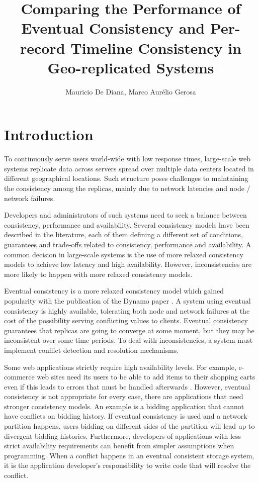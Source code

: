 \documentclass[man,floatsintext,12pt]{apa6}
\title{Comparing the Performance of Eventual Consistency and Per-record
Timeline Consistency in Geo-replicated Systems}
\author{Mauricio De Diana, Marco Aur\'{e}lio Gerosa}
\affiliation{Computer Science Department, University of S\~{a}o Paulo}
\begin{document}
\maketitle
\section{Introduction}

To continuously serve users world-wide with low response times, large-scale web
systems replicate data across servers spread over multiple data centers located
in different geographical locations. Such structure poses challenges to
maintaining the consistency among the replicas, mainly due to network latencies
and node / network failures.

Developers and administrators of such systems need to seek a balance between
consistency, performance and availability. Several consistency models have been
described in the literature, each of them defining a different set of
conditions, guarantees and trade-offs related to consistency, performance and
availability. A common decision in large-scale systems is the use of more
relaxed consistency models to achieve low latency and high availability.
However, inconsistencies are more likely to happen with more relaxed
consistency models.

Eventual consistency is a more relaxed consistency model which gained
popularity with the publication of the Dynamo paper \parencite{DeCandia2007}.  A
system using eventual consistency is highly available, tolerating both node and
network failures at the cost of the possibility serving conflicting values to
clients. Eventual consistency guarantees that replicas are going to converge at
some moment, but they may be inconsistent over some time periods. To deal with
inconsistencies, a system must implement conflict detection and resolution
mechanisms.

Some web applications strictly require high availability levels. For example,
e-commerce web sites need its users to be able to add items to their shopping
carts even if this leads to errors that must be handled afterwards
\parencite{DeCandia2007}. However, eventual consistency is not appropriate for every
case, there are applications that need stronger consistency models. An example
is a bidding application that cannot have conflicts on bidding history. If
eventual consistency is used and a network partition happens, users bidding on
different sides of the partition will lead up to divergent bidding histories.
Furthermore, developers of applications with less strict availability
requirements can benefit from simpler assumptions when programming. When a
conflict happens in an eventual consistent storage system, it is the
application developer's responsibility to write code that will resolve the
conflict.
\end{document}
